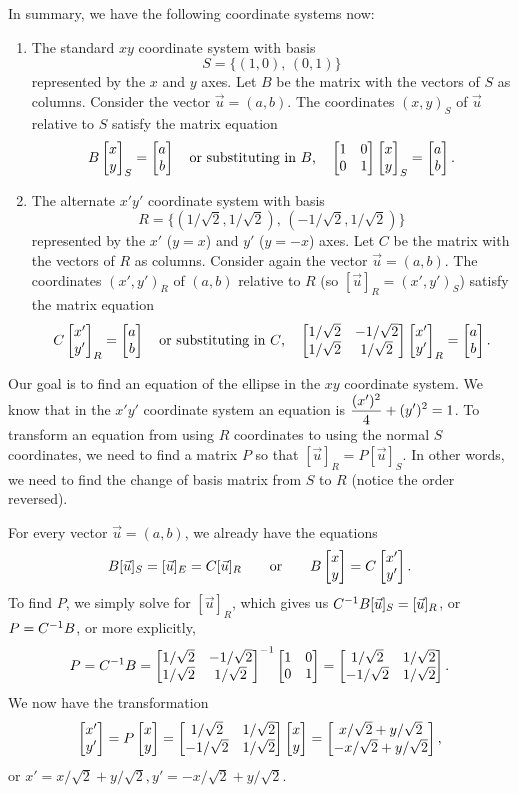 \begin{example}
In summary, we have the following coordinate systems now:
\begin{enumerate}
	\item The standard $xy$ coordinate system with basis $$S=\{(1,0),\,(0,1)\}$$ represented by the $x$ and $y$ axes.  Let $B$ be the matrix with the vectors of $S$ as columns.
	Consider the vector $\vec u = (a,b)$.  The coordinates $(x,y)_S$ of $\vec u$ relative to $S$ satisfy the matrix equation 
        $$B\begin{bmatrix} x\\y \end{bmatrix}_{S}=\begin{bmatrix} a\\b \end{bmatrix}\quad \text{or substituting in $B$,}\quad \begin{bmatrix} 1&0\\0&1 \end{bmatrix}\begin{bmatrix} x\\y \end{bmatrix}_{S}=\begin{bmatrix} a\\b \end{bmatrix}.$$
	\item The alternate $x'y'$ coordinate system with basis $$R=\{(1/\sqrt2,1/\sqrt{2}),\, (-1/\sqrt{2},1/\sqrt{2})\}$$ represented by the $x'$ ($y=x$) and $y'$ ($y=-x$) axes.  Let $C$ be the matrix with the vectors of $R$ as columns.
	Consider again the vector $\vec u = (a,b)$.  The coordinates $(x',y')_{R}$ of $(a,b)$ relative to $R$ (so $[\vec u]_{R} = (x',y')_S$) satisfy the matrix equation 
	$$C\begin{bmatrix} x'\\y' \end{bmatrix}_{R}=\begin{bmatrix} a\\b \end{bmatrix} \quad \text{or substituting in $C$,}\quad \begin{bmatrix} 1/\sqrt2 &-1/\sqrt2\\1/\sqrt2&1/\sqrt2 \end{bmatrix}\begin{bmatrix} x'\\y' \end{bmatrix}_{R}=\begin{bmatrix} a\\b \end{bmatrix}.$$
\end{enumerate}

Our goal is to find an equation of the ellipse in the $xy$ coordinate system. We know that in the $x'y'$ coordinate system an equation is $\displaystyle \frac{(x')^2}{4}+(y')^2=1$. 
To transform an equation from using $R$ coordinates to using the normal $S$ coordinates, we need to find a matrix $P$ so that $[\vec u]_R=P[\vec u]_S$.  In other words, we need to find the change of basis matrix from $S$ to $R$ (notice the order reversed).

For every vector $\vec u =(a,b)$, we already have the equations $$B[\vec u]_{S} = [\vec u]_E=C[\vec u]_{R}\quad \quad \text{or}\quad \quad B\begin{bmatrix} x\\y \end{bmatrix}=C\begin{bmatrix} x'\\y' \end{bmatrix}.$$ 
To find $P$, we simply solve for $[\vec u]_{R}$, which gives us $C^{-1} B[\vec u]_{S} = [\vec u]_{R}$, or $P=C^{-1} B$, or more explicitly,
$$P=C^{-1} B = \begin{bmatrix} 1/\sqrt2 &-1/\sqrt2\\1/\sqrt2&1/\sqrt2 \end{bmatrix}^{-1} \begin{bmatrix} 1&0\\0&1 \end{bmatrix} = \begin{bmatrix} 1/\sqrt2 &1/\sqrt2\\-1/\sqrt2&1/\sqrt2 \end{bmatrix}.$$
We now have the transformation 
$$\begin{bmatrix} x'\\y' \end{bmatrix} = P\begin{bmatrix} x\\y \end{bmatrix} = \begin{bmatrix} 1/\sqrt2 &1/\sqrt2\\-1/\sqrt2&1/\sqrt2 \end{bmatrix}\begin{bmatrix} x\\y \end{bmatrix} = \begin{bmatrix} x/\sqrt2+y/\sqrt2\\-x/\sqrt2+y/\sqrt{2} \end{bmatrix},$$
or $x'=x/\sqrt2+y/\sqrt2, y'=-x/\sqrt2+y/\sqrt2$.


\end{example}
